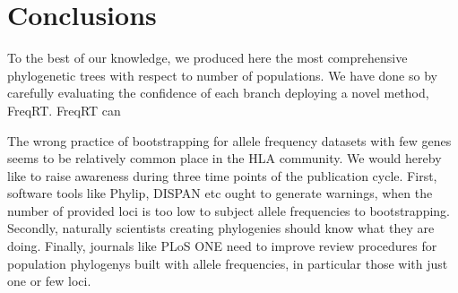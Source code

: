 \documentclass{article}
\begin{document}


\section{Conclusions}

To the best of our knowledge, we produced here the most comprehensive phylogenetic trees with respect to number of populations.
We have done so by carefully evaluating the confidence of each branch deploying a novel method, FreqRT.
FreqRT can


The wrong practice of bootstrapping for allele frequency datasets with few genes seems to be relatively common place in the HLA community.
We would hereby like to raise awareness during three time points of the publication cycle. First, software tools like
Phylip, DISPAN etc ought to generate warnings, when the number of provided loci is too low to subject allele frequencies to
bootstrapping. Secondly, naturally scientists creating phylogenies should know what they are doing. Finally, journals like
PLoS ONE need to improve review procedures for population phylogenys built with allele frequencies, in particular those with
just one or few loci.



\end{document}
